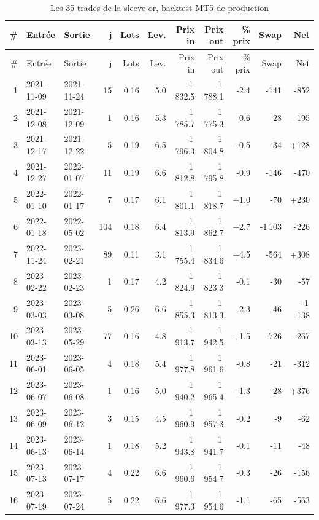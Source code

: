 \begin{longtable}{@{}rllrrrrrrrr@{}}
\caption{Les 35 trades de la sleeve or, backtest MT5 de production}\\
\toprule
\# & Entrée & Sortie & j & Lots & Lev. & Prix in & Prix out & \% prix & Swap & Net \\
\midrule
\endfirsthead
\toprule
\# & Entrée & Sortie & j & Lots & Lev. & Prix in & Prix out & \% prix & Swap & Net \\
\midrule
\endhead
1 & 2021-11-09 & 2021-11-24 & 15 & 0.16 & 5.0 & 1\,832.5 & 1\,788.1 & -2.4 & -141 & -852 \\
2 & 2021-12-08 & 2021-12-09 & 1 & 0.16 & 5.3 & 1\,785.7 & 1\,775.3 & -0.6 & -28 & -195 \\
3 & 2021-12-17 & 2021-12-22 & 5 & 0.19 & 6.5 & 1\,796.3 & 1\,804.8 & +0.5 & -34 & +128 \\
4 & 2021-12-27 & 2022-01-07 & 11 & 0.19 & 6.6 & 1\,812.8 & 1\,795.8 & -0.9 & -146 & -470 \\
5 & 2022-01-10 & 2022-01-17 & 7 & 0.17 & 6.1 & 1\,801.1 & 1\,818.7 & +1.0 & -70 & +230 \\
6 & 2022-01-18 & 2022-05-02 & 104 & 0.18 & 6.4 & 1\,813.9 & 1\,862.7 & +2.7 & -1\,103 & -226 \\
7 & 2022-11-24 & 2023-02-21 & 89 & 0.11 & 3.1 & 1\,755.4 & 1\,834.6 & +4.5 & -564 & +308 \\
8 & 2023-02-22 & 2023-02-23 & 1 & 0.17 & 4.2 & 1\,824.9 & 1\,823.3 & -0.1 & -30 & -57 \\
9 & 2023-03-03 & 2023-03-08 & 5 & 0.26 & 6.6 & 1\,855.3 & 1\,813.3 & -2.3 & -46 & -1\,138 \\
10 & 2023-03-13 & 2023-05-29 & 77 & 0.16 & 4.8 & 1\,913.7 & 1\,942.5 & +1.5 & -726 & -267 \\
11 & 2023-06-01 & 2023-06-05 & 4 & 0.18 & 5.4 & 1\,977.8 & 1\,961.6 & -0.8 & -21 & -312 \\
12 & 2023-06-07 & 2023-06-08 & 1 & 0.16 & 5.0 & 1\,940.2 & 1\,965.4 & +1.3 & -28 & +376 \\
13 & 2023-06-09 & 2023-06-12 & 3 & 0.15 & 4.5 & 1\,960.9 & 1\,957.3 & -0.2 & -9 & -62 \\
14 & 2023-06-13 & 2023-06-14 & 1 & 0.18 & 5.2 & 1\,943.8 & 1\,941.7 & -0.1 & -11 & -48 \\
15 & 2023-07-13 & 2023-07-17 & 4 & 0.22 & 6.6 & 1\,960.6 & 1\,954.7 & -0.3 & -26 & -156 \\
16 & 2023-07-19 & 2023-07-24 & 5 & 0.22 & 6.6 & 1\,977.3 & 1\,954.6 & -1.1 & -65 & -563 \\

\end{longtable}
